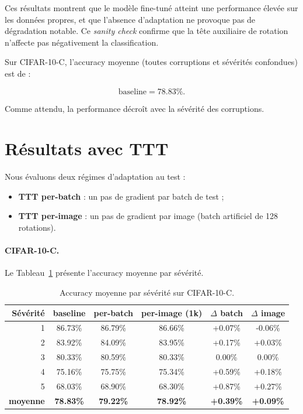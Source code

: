 \documentclass[12pt,a4paper]{report}
\begin{document}
	Ces résultats montrent que le modèle fine-tuné atteint une performance élevée sur les données propres, et que l’absence d’adaptation ne provoque pas de dégradation notable.  
	Ce \emph{sanity check} confirme que la tête auxiliaire de rotation n’affecte pas négativement la classification.
	
	Sur CIFAR-10-C, l’accuracy moyenne (toutes corruptions et sévérités confondues) est de :
	
	\[
	\text{baseline} = \mathbf{78.83\%}.
	\]
	
	Comme attendu, la performance décroît avec la sévérité des corruptions.
	
	\section{Résultats avec TTT}
	Nous évaluons deux régimes d’adaptation au test :
	\begin{itemize}
		\item \textbf{TTT per-batch} : un pas de gradient par batch de test ;
		\item \textbf{TTT per-image} : un pas de gradient par image (batch artificiel de 128 rotations).
	\end{itemize}
	
	\paragraph{CIFAR-10-C.}  
	Le Tableau~\ref{tab:severity_ttt} présente l’accuracy moyenne par sévérité.
	
	\begin{table}[H]
		\centering
		\small
		\begin{tabular}{r|ccc|cc}
			\toprule
			Sévérité & baseline & per-batch & per-image (1k) & $\Delta$ batch & $\Delta$ image \\
			\midrule
			1 & 86.73\% & 86.79\% & 86.66\% & +0.07\% & -0.06\% \\
			2 & 83.92\% & 84.09\% & 83.95\% & +0.17\% & +0.03\% \\
			3 & 80.33\% & 80.59\% & 80.33\% & 0.00\% & 0.00\% \\
			4 & 75.16\% & 75.75\% & 75.34\% & +0.59\% & +0.18\% \\
			5 & 68.03\% & 68.90\% & 68.30\% & +0.87\% & +0.27\% \\
			\midrule
			\textbf{moyenne} & \textbf{78.83\%} & \textbf{79.22\%} & \textbf{78.92\%} & \textbf{+0.39\%} & \textbf{+0.09\%} \\
			\bottomrule
		\end{tabular}
		\caption{Accuracy moyenne par sévérité sur CIFAR-10-C.}
		\label{tab:severity_ttt}
	\end{table}
	
\end{document}

